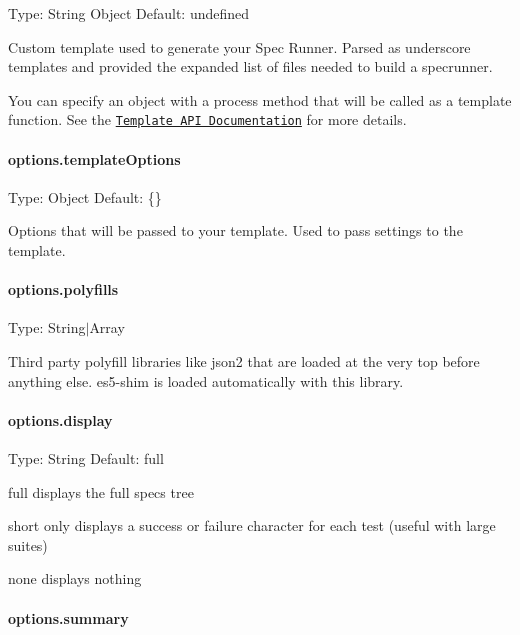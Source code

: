 Type\+: {\ttfamily String} {\ttfamily Object} Default\+: undefined

Custom template used to generate your Spec Runner. Parsed as underscore templates and provided the expanded list of files needed to build a specrunner.

You can specify an object with a {\ttfamily process} method that will be called as a template function. See the \href{https://github.com/gruntjs/grunt-contrib-jasmine/wiki/Jasmine-Templates}{\tt Template A\+P\+I Documentation} for more details.

\paragraph*{options.\+template\+Options}

Type\+: {\ttfamily Object} Default\+: {\ttfamily \{\}}

Options that will be passed to your template. Used to pass settings to the template.

\paragraph*{options.\+polyfills}

Type\+: {\ttfamily String$\vert$\+Array}

Third party polyfill libraries like json2 that are loaded at the very top before anything else. es5-\/shim is loaded automatically with this library.

\paragraph*{options.\+display}

Type\+: {\ttfamily String} Default\+: {\ttfamily full}


\begin{DoxyItemize}
\item {\ttfamily full} displays the full specs tree
\item {\ttfamily short} only displays a success or failure character for each test (useful with large suites)
\item {\ttfamily none} displays nothing
\end{DoxyItemize}

\paragraph*{options.\+summary}

